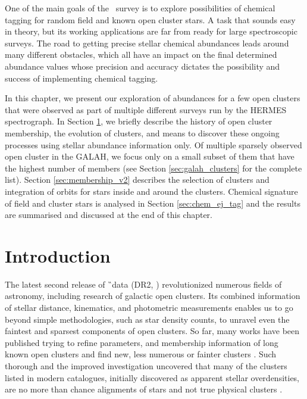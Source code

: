 One of the main goals of the \Gh\ survey is to explore possibilities of chemical tagging for random field and known open cluster stars. A task that sounds easy in theory, but its working applications are far from ready for large spectroscopic surveys. The road to getting precise stellar chemical abundances leads around many different obstacles, which all have an impact on the final determined abundance values whose precision and accuracy dictates the possibility and success of implementing chemical tagging.

In this chapter, we present our exploration of abundances for a few open clusters that were observed as part of multiple different surveys run by the HERMES spectrograph. In Section \ref{sec:intro_tag}, we briefly describe the history of open cluster membership, the evolution of clusters, and means to discover these ongoing processes using stellar abundance information only. Of multiple sparsely observed open cluster in the GALAH, we focus only on a small subset of them that have the highest number of members (see Section \ref{sec:galah_clusters} for the complete list). Section \ref{sec:membership_v2} describes the selection of clusters and integration of orbits for stars inside and around the clusters. Chemical signature of field and cluster stars is analysed in Section \ref{sec:chem_ej_tag} and the results are summarised and discussed at the end of this chapter.

\section{Introduction}
\label{sec:intro_tag}
The latest second release of \G\ data (DR2, \cite{2018A&A...616A...1G}) revolutionized numerous fields of astronomy, including research of galactic open clusters. Its combined information of stellar distance, kinematics, and photometric measurements enables us to go beyond simple methodologies, such as star density counts, to unravel even the faintest and sparsest components of open clusters. So far, many works have been published trying to refine parameters, and membership information of long known open clusters \cite{2017A&A...601A..19G, 2018A&A...618A..93C, 2019A&A...627A..35C} and find new, less numerous or fainter clusters \cite{2019ApJS..245...32L, 2019JKAS...52..145S, 2019A&A...624A.126C, 2020arXiv200107122C}. Such thorough and the improved investigation uncovered that many of the clusters listed in modern catalogues, initially discovered as apparent stellar overdensities, are no more than chance alignments of stars and not true physical clusters \cite{1998A&A...340..402B, 2000A&A...357..145C, 2016AJ....152....7H, 2018MNRAS.480.5242K, 2020A&A...633A..99C}.

